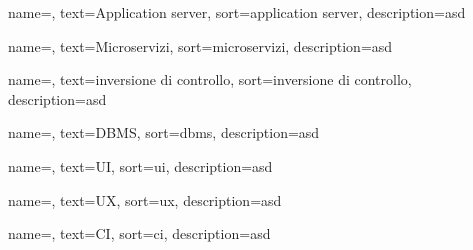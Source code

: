 {
    name=,
    text=Application server,
    sort=application server,
    description=asd
}

{
    name=,
    text=Microservizi,
    sort=microservizi,
    description=asd
}

{
    name=,
    text=inversione di controllo,
    sort=inversione di controllo,
    description=asd
}

{
    name=,
    text=DBMS,
    sort=dbms,
    description=asd
}

{
    name=,
    text=UI,
    sort=ui,
    description=asd
}

{
    name=,
    text=UX,
    sort=ux,
    description=asd
}

{
    name=,
    text=CI,
    sort=ci,
    description=asd
}